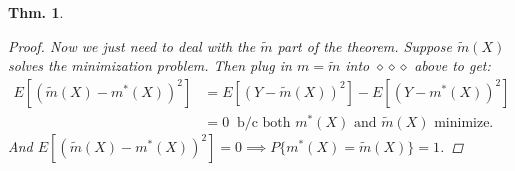 \documentclass{tufte-book}
\theoremstyle{mytheoremstyle}
\newtheorem*{thm}{Thm.}
\theoremstyle{mylemstyle}
\theoremstyle{mydefstyle}
\begin{document}
\begin{thm}
\begin{proof}
	Now we just need to deal with the \(\tilde{m}\) part of the theorem. Suppose \(\tilde{m}(X)\) solves the minimization problem. Then plug in \(m = \tilde{m}\) into \(\diamond \diamond \diamond \) above to get: \marginnote{\(\diamond \diamond \diamond \diamond \diamond \diamond \diamond \diamond \diamond \diamond \diamond \diamond \diamond \diamond \diamond \diamond \diamond \diamond \diamond \diamond \diamond \diamond \diamond \diamond \diamond \diamond \diamond \diamond \diamond \diamond \diamond \diamond \diamond \diamond \diamond \diamond \diamond \diamond \diamond \diamond \diamond \diamond \diamond \diamond \diamond \diamond \diamond \diamond \diamond \diamond \diamond \diamond \diamond \diamond \diamond \diamond \diamond \diamond \diamond \diamond \diamond \diamond \diamond \diamond \diamond \diamond \diamond \diamond \diamond \diamond \diamond \diamond\) }
		\begin{align*}
			E[(\tilde{m}(X) - m^*(X))^2] & = E[(Y - \tilde{m}(X))^2] - E[(Y - m^*(X))^2] \\
								& = 0\ \text{ b/c both \(m^*(X)\) and \(\tilde{m}(X)\) minimize. }
		\end{align*}
	And \(E[(\tilde{m}(X) - m^*(X))^2] = 0 \implies P\{m^*(X) = \tilde{m}(X)\} = 1\).
	\end{proof}
\end{thm}
\end{document}

